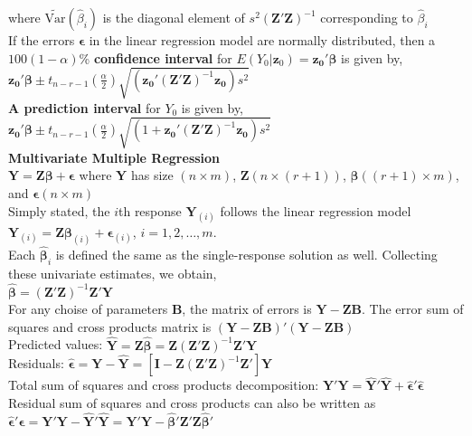 \documentclass[5pt,twocolumn]{article}
\begin{document}
	\indent where $\widetilde{\text{Var}}(\hat{\beta}_i)$ is the diagonal element of $s^2(\mathbf{Z'Z})^{-1}$ corresponding to $\hat{\beta}_i$\\
	If the errors $\mathbf{\epsilon}$ in the linear regression model are normally distributed, then a $100(1-\alpha)$\% \textbf{confidence interval} for $E(Y_0|\mathbf{z}_0) = \mathbf{z_0'\beta}$ is given by,\\
	\indent $\mathbf{z_0'\beta} \pm t_{n-r-1}\left(\frac{\alpha}{2}\right)\sqrt{(\mathbf{z_0'}(\mathbf{Z'Z})^{-1}\mathbf{z_0})s^2}$\\
	\textbf{A prediction interval} for $Y_0$ is given by,\\
	\indent $\mathbf{z_0'\beta} \pm t_{n-r-1}\left(\frac{\alpha}{2}\right)\sqrt{(1 +\mathbf{z_0'}(\mathbf{Z'Z})^{-1}\mathbf{z_0})s^2}$\\
	\textbf{Multivariate Multiple Regression}\\
	\indent $\mathbf{Y} = \mathbf{Z\beta} + \mathbf{\epsilon}$ where $\mathbf{Y}$ has size $(n \times m)$, $\mathbf{Z} (n \times (r+1))$, $\mathbf{\beta} ((r+1) \times m)$, and $\mathbf{\epsilon} (n \times m)$\\
	\indent Simply stated, the $i$th response $\mathbf{Y}_{(i)}$ follows the linear regression model $\mathbf{Y}_{(i)} = \mathbf{Z\beta}_{(i)} + \mathbf{\epsilon}_{(i)}$, $i = 1, 2, \ldots, m$.\\
	\indent Each $\mathbf{\hat{\beta}}_i$ is defined the same as the single-response solution as well. Collecting these univariate estimates, we obtain,\\
	\indent $\mathbf{\hat{\beta}} = (\mathbf{Z'Z})^{-1}\mathbf{Z'Y}$\\
	\indent For any choise of parameters $\mathbf{B}$, the matrix of errors is $\mathbf{Y} - \mathbf{ZB}$. The error sum of squares and cross products matrix is $(\mathbf{Y} - \mathbf{ZB})'(\mathbf{Y} - \mathbf{ZB})$\\
	\indent Predicted values: $\mathbf{\hat{Y}} = \mathbf{Z\hat{\beta}} = \mathbf{Z}(\mathbf{Z'Z})^{-1}\mathbf{Z'Y}$\\
	\indent Residuals: $\mathbf{\hat{\epsilon}} = \mathbf{Y} - \mathbf{\hat{Y}} = [\mathbf{I} - \mathbf{Z}(\mathbf{Z'Z})^{-1}\mathbf{Z}']\mathbf{Y}$\\
	\indent Total sum of squares and cross products decomposition: $\mathbf{Y'Y} = \mathbf{\hat{Y}'\hat{Y}} + \mathbf{\hat{\epsilon}'\hat{\epsilon}}$\\
	\indent Residual sum of squares and cross products can also be written as $\mathbf{\hat{\epsilon}'\hat{\epsilon}} = \mathbf{Y'Y} - \mathbf{\hat{Y}'\hat{Y}} = \mathbf{Y'Y} - \mathbf{\hat{\beta}'Z'Z\hat{\beta}'}$\\
\end{document}
